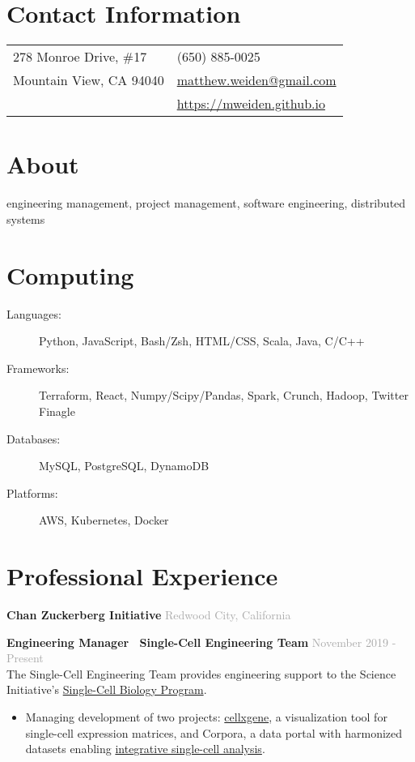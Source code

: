 \documentclass[margin,line]{res}
\newenvironment{list1}{
  \begin{list}{\ding{113}}{%
      \setlength{\itemsep}{0in}
      \setlength{\parsep}{0in} \setlength{\parskip}{0in}
      \setlength{\topsep}{0in} \setlength{\partopsep}{0in}
      \setlength{\leftmargin}{0.17in}}}{\end{list}}
\begin{document}

\begin{resume}
\section{\sc Contact Information}
\vspace{.05in}
\begin{tabular}{@{}p{2in}p{4in}}
278 Monroe Drive, \#17             & (650) 885-0025 \\
Mountain View, CA 94040 & \href{mailto:matthew.weiden@gmail.com}{matthew.weiden@gmail.com}\\
  & \href{https://mweiden.github.io}{https://mweiden.github.io}
\end{tabular}

\section{\sc About}
engineering management, project management, software engineering, distributed systems

\section{\sc Computing}
\begin{description}
\item[Languages:] Python, JavaScript, Bash/Zsh, HTML/CSS, Scala, Java, C/C++
\item[Frameworks:] Terraform, React, Numpy/Scipy/Pandas, Spark, Crunch, Hadoop, Twitter Finagle
\item[Databases:] MySQL, PostgreSQL, DynamoDB
\item[Platforms:] AWS, Kubernetes, Docker
\end{description}

\section{\sc Professional Experience}

{\bf Chan Zuckerberg Initiative} \hfill \textcolor{darkgray}{Redwood City, California}\\
\begin{list1}
\setlength\itemsep{1em}
\item[] {\bf Engineering Manager \textbar ~Single-Cell Engineering Team} \hfill \textcolor{darkgray}{November 2019 - Present} \vspace{1mm} \\
The Single-Cell Engineering Team provides engineering support to the Science Initiative's \href{https://chanzuckerberg.com/science/programs-resources/single-cell-biology/}{Single-Cell Biology Program}.
\begin{itemize}
\item Managing development of two projects: \href{https://github.com/chanzuckerberg/cellxgene}{cellxgene}, a visualization tool for single-cell expression matrices, and Corpora, a data portal with harmonized datasets enabling \href{https://www.nature.com/articles/s41576-019-0093-7}{integrative single-cell analysis}.
\end{itemize}


\end{list1}
\end{resume}
\end{document}
